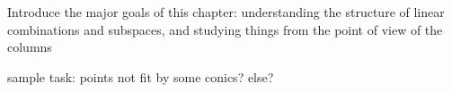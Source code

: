 \documentclass[elementsmain.tex]{subfiles}
\begin{document}
Introduce the major goals of this chapter: understanding the structure of linear combinations and subspaces, and studying things from the point of view of the columns

sample task: points not fit by some conics? else?


\clearpage
\end{document}

